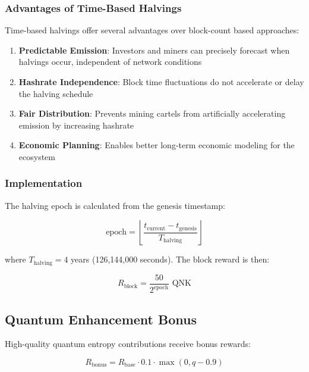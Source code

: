 \documentclass[11pt,a4paper]{article}
\begin{document}
\subsubsection{Advantages of Time-Based Halvings}

Time-based halvings offer several advantages over block-count based approaches:

\begin{enumerate}
    \item \textbf{Predictable Emission}: Investors and miners can precisely forecast when halvings occur, independent of network conditions
    \item \textbf{Hashrate Independence}: Block time fluctuations do not accelerate or delay the halving schedule
    \item \textbf{Fair Distribution}: Prevents mining cartels from artificially accelerating emission by increasing hashrate
    \item \textbf{Economic Planning}: Enables better long-term economic modeling for the ecosystem
\end{enumerate}

\subsubsection{Implementation}

The halving epoch is calculated from the genesis timestamp:

\begin{equation}
    \text{epoch} = \left\lfloor \frac{t_{\text{current}} - t_{\text{genesis}}}{T_{\text{halving}}} \right\rfloor
\end{equation}

where $T_{\text{halving}} = 4$ years (126,144,000 seconds). The block reward is then:

\begin{equation}
    R_{\text{block}} = \frac{50}{2^{\text{epoch}}} \text{ QNK}
\end{equation}

\subsection{Quantum Enhancement Bonus}

High-quality quantum entropy contributions receive bonus rewards:

\begin{equation}
    R_{\text{bonus}} = R_{\text{base}} \cdot 0.1 \cdot \max(0, q - 0.9)
\end{equation}
\end{document}
